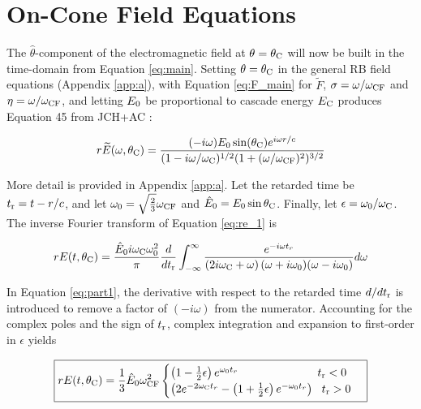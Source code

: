 \documentclass[amsmath,amssymb,aps,prd,10pt,twocolumn]{revtex4}
\begin{document}
\section{On-Cone Field Equations}
\label{sec:onc}

The $\hat{\theta}$-component of the electromagnetic field at $\theta = \theta_{\rm C}$ will now be built in the time-domain from Equation \ref{eq:main}.  Setting $\theta = \theta_{\rm C}$ in the general RB field equations (Appendix \ref{app:a}), with Equation \ref{eq:F_main} for $\widetilde{F}$, $\sigma = \omega/\omega_{\rm CF}$ and $\eta = \omega/\omega_{\rm CF}$, and letting $E_{\rm 0}$ be proportional to cascade energy $E_{\rm C}$ produces Equation 45 from JCH+AC \cite{10.1016/j.astropartphys.2017.03.008}:

\begin{equation}
r\widetilde{E}(\omega,\theta_{\rm C}) = \frac{(-i\omega) E_0 \sin(\theta_{\rm C}) e^{i\omega r/c}}{(1-i \omega/\omega_{\rm C})^{1/2} (1+(\omega/\omega_{\rm CF})^2)^{3/2}} \label{eq:re_1}
\end{equation}

More detail is provided in Appendix \ref{app:a}. Let the retarded time be $t_{\rm r} = t - r/c$, and let $\omega_0 = \sqrt{\frac{2}{3	}}\omega_{\rm CF}$ and $\hat{E}_{\rm 0} = E_{\rm 0} \sin\theta_{\rm C}$.  Finally, let $\epsilon = \omega_0/\omega_{\rm C}$.  The inverse Fourier transform of Equation \ref{eq:re_1} is

\begin{widetext}
\begin{equation}
r E(t,\theta_{\rm C}) = \frac{\hat{E}_0 i \omega_{\rm C} \omega_{\rm 0}^2}{\pi} \frac{d}{dt_{\rm r}}\int_{-\infty}^{\infty} \frac{ e^{-i\omega t_r}}{ \left(2 i \omega_{\rm C} + \omega \right) (\omega+i\omega_{\rm 0}) (\omega - i\omega_{\rm 0}) } d\omega \label{eq:part1}
\end{equation}
\end{widetext}

In Equation \ref{eq:part1}, the derivative with respect to the retarded time $d/dt_{\rm r}$ is introduced to remove a factor of $(-i\omega)$ from the numerator.  Accounting for the complex poles and the sign of $t_{\rm r}$, complex integration and expansion to first-order in $\epsilon$ yields

\begin{widetext}
\begin{equation}
\boxed{
r E(t,\theta_{\rm C}) = \frac{1}{3} \hat{E}_0 \omega_{\rm CF}^2
\begin{cases}
\left(1 - \frac{1}{2}\epsilon \right)e^{\omega_{\rm 0} t_r} ~~~~~~~~~~~~~~~~~~~~~ t_{\rm r} < 0 \\
\left( 2 e^{-2\omega_{\rm C} t_r} - \left(1+\frac{1}{2}\epsilon \right) e^{-\omega_{\rm 0}t_r} \right) ~~ t_{\rm r} > 0
\end{cases}
} \label{eq:on_cone}
\end{equation}
\end{widetext}
\end{document}
